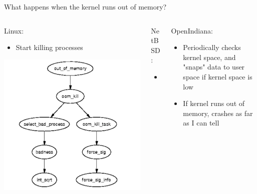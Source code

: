 \documentclass[aspectratio=169]{beamer}
\newcommand{\bi}{\begin{itemize}}
\newcommand{\ei}{\end{itemize}}
\begin{document}
\begin{frame}{What happens when the kernel runs out of memory?}
  \begin{columns}[T]
    \begin{column}{0.3\textwidth}
      Linux:
      \bi
    \item Start killing processes
      \ei
      \includegraphics[scale=0.35]{./figures/linux4.png}
    \end{column}
    \pause
    \begin{column}{0.4\textwidth}
      NetBSD:
      \bi
    \item Panic!
      \ei
    \end{column}
    \pause
    \begin{column}{0.3\textwidth}
      OpenIndiana:
      \bi
    \item Periodically checks kernel space, and "snaps" data to user space if
        kernel space is low
    \item If kernel runs out of memory, crashes as far as I can tell
      \ei
    \end{column}
  \end{columns}
\end{frame}
\end{document}
